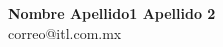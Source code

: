 


\divider

\divider

\divider

\divider

\divider

\divider

\divider

\divider





{\bf Nombre Apellido1 Apellido 2}\\
correo@itl.com.mx


